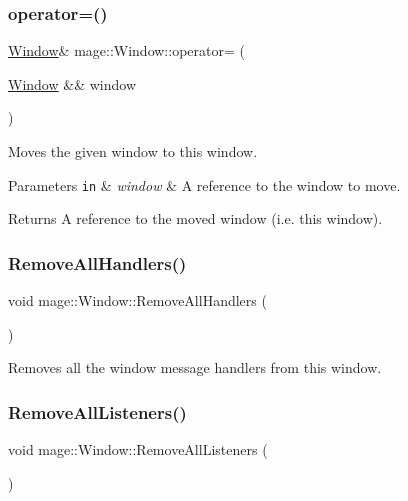 \subsubsection{\texorpdfstring{operator=()}{operator=()}\hspace{0.1cm}{\footnotesize\ttfamily [2/2]}}
{\footnotesize\ttfamily \mbox{\hyperlink{classmage_1_1_window}{Window}}\& mage\+::\+Window\+::operator= (\begin{DoxyParamCaption}\item[{\mbox{\hyperlink{classmage_1_1_window}{Window}} \&\&}]{window }\end{DoxyParamCaption})\hspace{0.3cm}{\ttfamily [delete]}}

Moves the given window to this window.


\begin{DoxyParams}[1]{Parameters}
\mbox{\tt in}  & {\em window} & A reference to the window to move. \\
\hline
\end{DoxyParams}
\begin{DoxyReturn}{Returns}
A reference to the moved window (i.\+e. this window). 
\end{DoxyReturn}
\mbox{\label{classmage_1_1_window_a9b1efac3d0bd27df4e33ab704bc59f98}} 
\subsubsection{\texorpdfstring{Remove\+All\+Handlers()}{RemoveAllHandlers()}}
{\footnotesize\ttfamily void mage\+::\+Window\+::\+Remove\+All\+Handlers (\begin{DoxyParamCaption}{ }\end{DoxyParamCaption})\hspace{0.3cm}{\ttfamily [noexcept]}}

Removes all the window message handlers from this window. \mbox{\label{classmage_1_1_window_a1bb37381e94c541027d1ee4da7f6c7e2}} 
\subsubsection{\texorpdfstring{Remove\+All\+Listeners()}{RemoveAllListeners()}}
{\footnotesize\ttfamily void mage\+::\+Window\+::\+Remove\+All\+Listeners (\begin{DoxyParamCaption}{ }\end{DoxyParamCaption})\hspace{0.3cm}{\ttfamily [noexcept]}}

